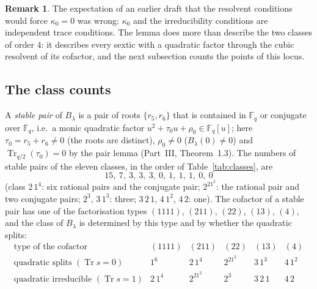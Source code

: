 \documentclass[12pt,a4paper]{amsart}
\theoremstyle{definition}
\newtheorem{remark}[theorem]{Remark}
\newcommand{\F}{\mathbb{F}}
\newcommand{\Tr}{\operatorname{Tr}}
\begin{document}
\begin{remark}
The expectation of an earlier draft that the resolvent conditions would force $\kappa_0=0$ was wrong: $\kappa_0$ and the irreducibility conditions are independent trace conditions. The lemma does more than describe the two classes of order $4$: it describes every sextic with a quadratic factor through the cubic resolvent of its cofactor, and the next subsection counts the points of this locus.
\end{remark}

\subsection{The class counts}\label{subsec:counts}
A \emph{stable pair} of $B_\lambda$ is a pair of roots $\{r_5,r_6\}$ that is contained in $\F_q$ or conjugate over $\F_q$, i.e.\ a monic quadratic factor $u^2+\tau_0u+\rho_0\in\F_q[u]$; here $\tau_0=r_5+r_6\ne0$ (the roots are distinct), $\rho_0\ne0$ ($B_\lambda(0)\ne0$) and $\Tr_{q/2}(\tau_0)=0$ by the pair lemma (Part~III, Theorem~1.3). The numbers of stable pairs of the eleven classes, in the order of Table~\ref{tab:classes}, are
\[
15,\ 7,\ 3,\ 3,\ 3,\ 0,\ 1,\ 1,\ 1,\ 0,\ 0
\]
(class $2\,1^4$: six rational pairs and the conjugate pair; $2^21^2$: the rational pair and two conjugate pairs; $2^3$, $3\,1^3$: three; $3\,2\,1$, $4\,1^2$, $4\,2$: one). The cofactor of a stable pair has one of the factorisation types $(1111)$, $(211)$, $(22)$, $(13)$, $(4)$, and the class of $B_\lambda$ is determined by this type and by whether the quadratic splits:
\begin{equation}\label{eq:typetable}
\begin{array}{c|ccccc}
\text{type of the cofactor} & (1111) & (211) & (22) & (13) & (4)\\
\hline
\text{quadratic splits } (\Tr s=0) & 1^6 & 2\,1^4 & 2^21^2 & 3\,1^3 & 4\,1^2\\
\text{quadratic irreducible } (\Tr s=1) & 2\,1^4 & 2^21^2 & 2^3 & 3\,2\,1 & 4\,2
\end{array}
\end{equation}
\end{document}
